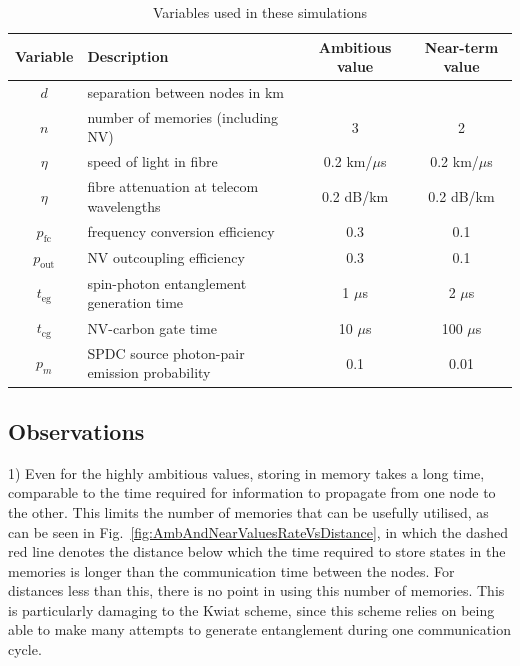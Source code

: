 \documentclass[aps,pra,superscriptaddress,preprint]{revtex4-1}
\begin{document}
\begin{table}[ht]
\caption{Variables used in these simulations}
\begin{center}
\begin{tabular}{|c|l|c|c|}
\hline
Variable & Description & Ambitious value & Near-term value \\ \hline
$d$ & separation between nodes in km & & \\
$n$ & number of memories (including NV) & 3 & 2 \\
$\eta$ & speed of light in fibre & 0.2 km/$\mu$s & 0.2 km/$\mu$s \\
$\eta$ & fibre attenuation at telecom wavelengths & 0.2 dB/km & 0.2 dB/km \\
$p_\text{fc}$ & frequency conversion efficiency & 0.3 & 0.1 \\
$p_\text{out}$ & NV outcoupling efficiency & 0.3 & 0.1 \\
$t_\text{eg}$ & spin-photon entanglement generation time &1 $\mu$s & 2 $\mu$s\\
$t_\text{cg}$ & NV-carbon gate time  & 10 $\mu$s & 100 $\mu$s \\
$p_m$ & SPDC source photon-pair emission probability  & 0.1 & 0.01 \\ \hline
\end{tabular}
\end{center}
\label{tab:Variables}
\end{table}%

%

\subsection{Observations}

1) Even for the highly ambitious values, storing in memory takes a long time, comparable to the time required for information to propagate from one node to the other. This limits the number of memories that can be usefully utilised, as can be seen in Fig.~\ref{fig:AmbAndNearValuesRateVsDistance}, in which the dashed red line denotes the distance below which the time required to store states in the memories is longer than the communication time between the nodes. For distances less than this, there is no point in using this number of memories. This is particularly damaging to the Kwiat scheme, since this scheme relies on being able to make many attempts to generate entanglement during one communication cycle.
\end{document}
